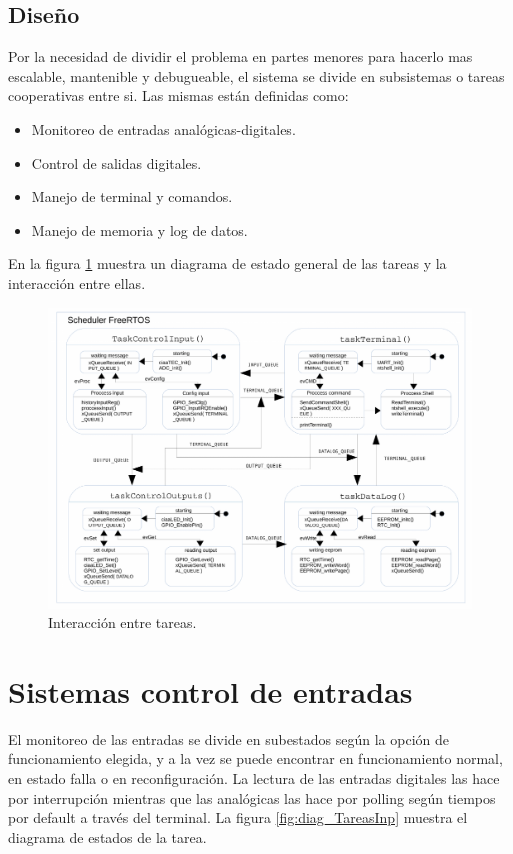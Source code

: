 \subsection{ Diseño }

Por la necesidad de dividir el problema en partes menores para hacerlo mas escalable, mantenible y debugueable, el sistema se divide en subsistemas o tareas cooperativas entre si. Las mismas están definidas como:
\begin{itemize}
	\item Monitoreo de entradas analógicas-digitales.
	\item Control de salidas digitales.
	\item Manejo de terminal y comandos.
	\item Manejo de memoria y log de datos.
\end{itemize}

En la figura \ref{fig:diag_Tareas} muestra un diagrama de estado general de las tareas y la interacción entre ellas.
\begin{figure}[h!]
	\hspace{-1.0cm}
	\includegraphics[width=1.1\textwidth]{Figures/Cap_3/diagrama_tareas}
	\caption{ Interacción entre tareas. }
	\label{fig:diag_Tareas}
\end{figure}

\section{ Sistemas control de entradas }
El monitoreo de las entradas se divide en subestados según la opción de funcionamiento elegida, y a la vez se puede encontrar en funcionamiento normal, en estado falla o en reconfiguración. 
La lectura de las entradas digitales las hace por interrupción mientras que las analógicas las hace por polling según tiempos por default a través del terminal. La figura \ref{fig:diag_TareasInp} muestra el diagrama de estados de la tarea.
 
